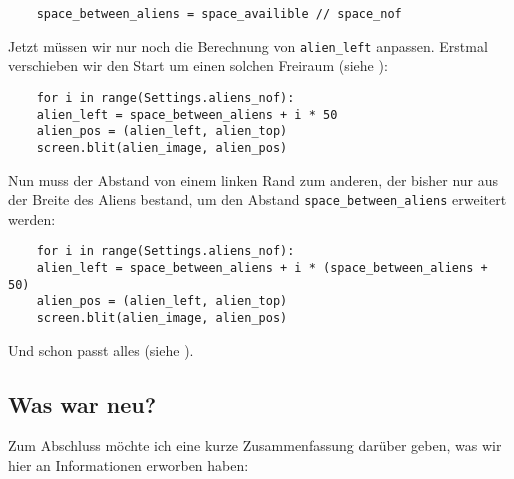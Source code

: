 \lstset{firstnumber=32}
\begin{lstlisting}
	space_between_aliens = space_availible // space_nof
\end{lstlisting}

Jetzt müssen wir nur noch die Berechnung von \texttt{alien\_left} anpassen. Erstmal verschieben wir den Start um einen solchen Freiraum (siehe ):

\lstset{firstnumber=45}
\begin{lstlisting}
	for i in range(Settings.aliens_nof):
	alien_left = space_between_aliens + i * 50
	alien_pos = (alien_left, alien_top)
	screen.blit(alien_image, alien_pos)
\end{lstlisting}


Nun muss der Abstand von einem linken Rand zum anderen, der bisher nur aus der Breite des Aliens bestand, um den Abstand \texttt{space\_between\_aliens} erweitert werden:

\lstset{firstnumber=45}
\begin{lstlisting}
	for i in range(Settings.aliens_nof):
	alien_left = space_between_aliens + i * (space_between_aliens + 50)
	alien_pos = (alien_left, alien_top)
	screen.blit(alien_image, alien_pos)
\end{lstlisting} 

Und schon passt alles (siehe ).



\subsection*{Was war neu?}

Zum Abschluss möchte ich eine kurze Zusammenfassung darüber geben, was wir hier an Informationen erworben haben:

